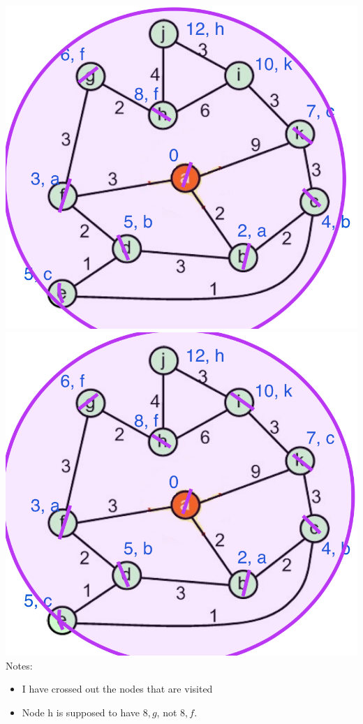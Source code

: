 \documentclass[a4paper]{exam}
\begin{document}
\begin{questions}
\begin{parts}
\begin{solution}
    \includegraphics[scale=0.2]{Q3/images3g/3g9}
    \includegraphics[scale=0.2]{Q3/images3g/3g10}\\
    Notes:\\
    \begin{itemize}
      \item I have crossed out the nodes that are visited
      \item Node h is supposed to have $8,g$, not $8,f$.
    \end{itemize}
    \end{solution}

\end{parts}
\end{questions}
\end{document}
